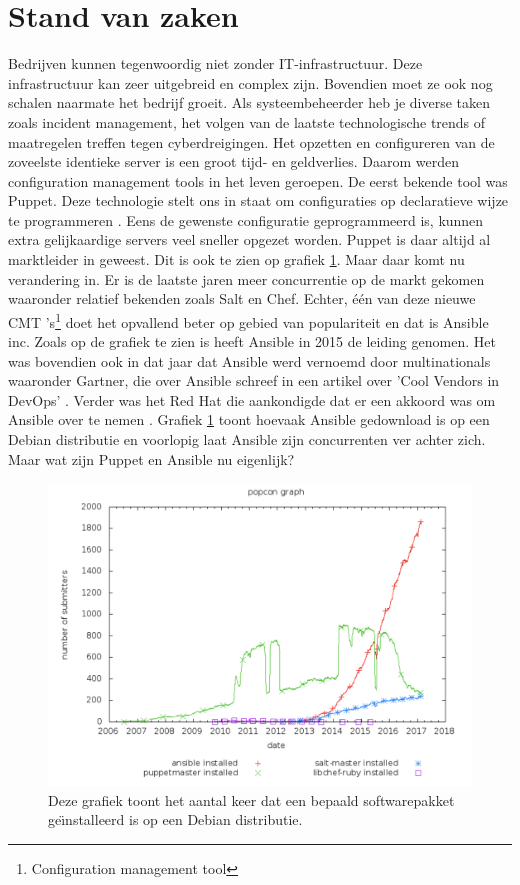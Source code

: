 \section{Stand van zaken}
\label{sec:stand-van-zaken}
Bedrijven kunnen tegenwoordig niet zonder IT-infrastructuur. Deze infrastructuur kan zeer uitgebreid en complex zijn. Bovendien moet ze ook nog schalen naarmate het bedrijf groeit. Als systeembeheerder heb je diverse taken zoals incident management, 
het volgen van de laatste technologische trends of maatregelen treffen tegen cyberdreigingen. Het opzetten en configureren van de zoveelste identieke server is een groot tijd- en geldverlies. Daarom werden configuration management tools in het leven geroepen. De eerst bekende tool was Puppet. Deze technologie stelt ons in staat om configuraties op declaratieve wijze te programmeren \autocite{PuppetDeclaratief}. Eens de gewenste configuratie geprogrammeerd is, kunnen extra gelijkaardige servers veel sneller opgezet worden. 
Puppet is daar altijd al marktleider in geweest. Dit is ook te zien op grafiek \ref{fig:popcon_everybody}. Maar daar komt nu verandering in. Er is de laatste jaren meer concurrentie op de markt gekomen waaronder relatief bekenden zoals Salt en Chef. 
Echter,  \'e\'en van deze nieuwe CMT 's\footnote{Configuration management tool} doet het opvallend beter op gebied van populariteit en dat is Ansible inc. Zoals op de grafiek te zien is heeft Ansible in 2015 de leiding genomen. Het was bovendien ook in dat jaar dat Ansible werd vernoemd door multinationals waaronder Gartner, die over Ansible schreef in een artikel over  'Cool Vendors in DevOps' \autocite{coolvendors}. Verder was het Red Hat die aankondigde dat er een akkoord was om Ansible over te nemen \autocite{redhatovername}. Grafiek \ref{fig:popcon_everybody} toont hoevaak Ansible gedownload is op een Debian distributie en voorlopig laat Ansible zijn concurrenten ver achter zich. Maar wat zijn Puppet en Ansible nu eigenlijk?


\begin{figure}
  \includegraphics[width=\linewidth]{img/popcon_everybody.png}
  \caption{Deze grafiek toont het aantal keer dat een bepaald softwarepakket ge\"{\i}nstalleerd is op een Debian distributie. \autocite{popcon}}
  \label{fig:popcon_everybody}
\end{figure}

